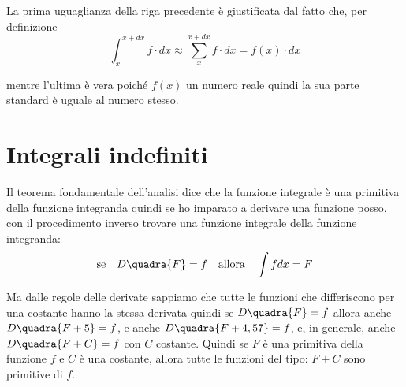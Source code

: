 La prima uguaglianza della riga
precedente è giustificata dal fatto che, per definizione 
\[\int_x^{x+dx} f \cdot dx \approx \sum_x^{x+dx} f \cdot dx = f(x) \cdot dx\]

mentre l'ultima è vera poiché \(f(x)\) un numero reale quindi la sua parte 
standard è uguale al numero stesso. 

% 
% 

\section{Integrali indefiniti}
\label{sec:integrali_indefiniti}

Il teorema fondamentale dell'analisi dice che la funzione integrale è una 
primitiva della funzione integranda quindi se ho imparato a derivare una 
funzione posso, con il procedimento inverso trovare una funzione integrale 
della funzione integranda:
\[\text{se} \quad D \quadra{F} = f \quad \text{allora} \quad \int f dx = F\]

Ma dalle regole delle derivate sappiamo che tutte le funzioni che 
differiscono per una costante hanno la stessa derivata quindi se 
\(D \quadra{F} = f\) allora anche \(D \quadra{F+5} = f\), e anche 
\(D \quadra{F+4,57} = f\), e, in generale, anche \(D \quadra{F+C} = f\) con 
\(C\) costante.
Quindi se \(F\) è una primitiva della funzione \(f\) e \(C\) è una 
costante, allora tutte le funzioni del tipo: \(F + C\) sono primitive di 
\(f\).

